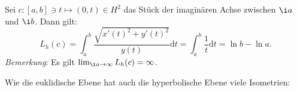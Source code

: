 \begin{example}
  Sei \( c: [a,b] \ni t \mapsto (0,t) \in H^2 \) das Stück der imaginären Achse zwischen \( \i a \) und \( \i b \). Dann gilt:
  \begin{equation*}
    L_h(c) = \int_a^b \frac{\sqrt{{x'(t)}^2 + {y'(t)}^2}}{y(t)}\text{d}t = \int_a^b \frac{1}{t}\text{d}t = \ln b - \ln a\text{.}
  \end{equation*}
  \emph{Bemerkung}: Es gilt \( \lim_{\i a \to \infty}L_h(c) = \infty \).
\end{example}

Wie die euklidische Ebene hat auch die hyperbolische Ebene viele Isometrien: